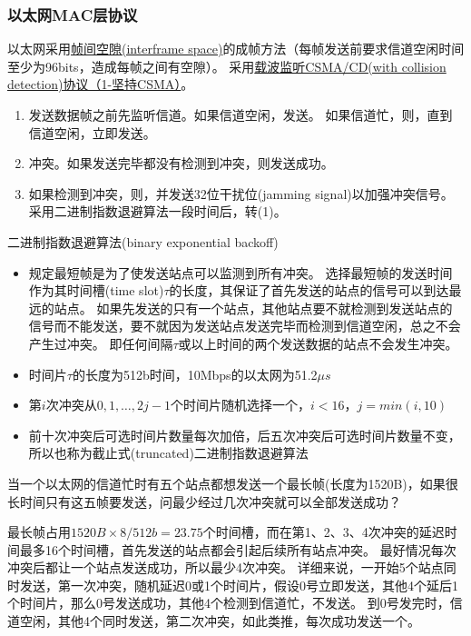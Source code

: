\subsubsection{以太网MAC层协议}
以太网采用\underline{帧间空隙(interframe space)}的成帧方法（每帧发送前要求信道空闲时间至少为96bits，造成每帧之间有空隙）。
采用\underline{载波监听CSMA/CD(with collision detection)协议（1-坚持CSMA）}。
\begin{enumerate}
	\item 发送数据帧之前先监听信道。如果信道空闲，发送。
	如果信道忙，则，直到信道空闲，立即发送。
	\item {}冲突。如果发送完毕都没有检测到冲突，则发送成功。
	\item 如果检测到冲突，则，并发送32位干扰位(jamming signal)以加强冲突信号。
	采用二进制指数退避算法一段时间后，转(1)。
\end{enumerate}

\myhline
二进制指数退避算法(binary exponential backoff)
\begin{itemize}
	\item 规定最短帧是为了使发送站点可以监测到所有冲突。
	选择最短帧的发送时间作为其时间槽(time slot)$\tau$的长度，其保证了首先发送的站点的信号可以到达最远的站点。
	如果先发送的只有一个站点，其他站点要不就检测到发送站点的信号而不能发送，要不就因为发送站点发送完毕而检测到信道空闲，总之不会产生过冲突。
	即任何间隔$\tau$或以上时间的两个发送数据的站点不会发生冲突。
	\item 时间片$\tau$的长度为512b时间，10Mbps的以太网为51.2$\mu s$
	\item 第$i$次冲突从$0,1,\ldots,2j-1$个时间片随机选择一个，$i<16$，$j = min(i,10)$
	\item 前十次冲突后可选时间片数量每次加倍，后五次冲突后可选时间片数量不变，\\
	所以也称为截止式(truncated)二进制指数退避算法
\end{itemize}
\begin{example}
	当一个以太网的信道忙时有五个站点都想发送一个最长帧(长度为1520B)，如果很长时间只有这五帧要发送，问最少经过几次冲突就可以全部发送成功？
\end{example}
\begin{analysis}
	最长帧占用$1520B\times 8/512b=23.75$个时间槽，而在第1、2、3、4次冲突的延迟时间最多16个时间槽，首先发送的站点都会引起后续所有站点冲突。
	最好情况每次冲突后都让一个站点发送成功，所以最少4次冲突。
	详细来说，一开始5个站点同时发送，第一次冲突，随机延迟0或1个时间片，假设0号立即发送，其他4个延后1个时间片，那么0号发送成功，其他4个检测到信道忙，不发送。
	到0号发完时，信道空闲，其他4个同时发送，第二次冲突，如此类推，每次成功发送一个。
\end{analysis}

